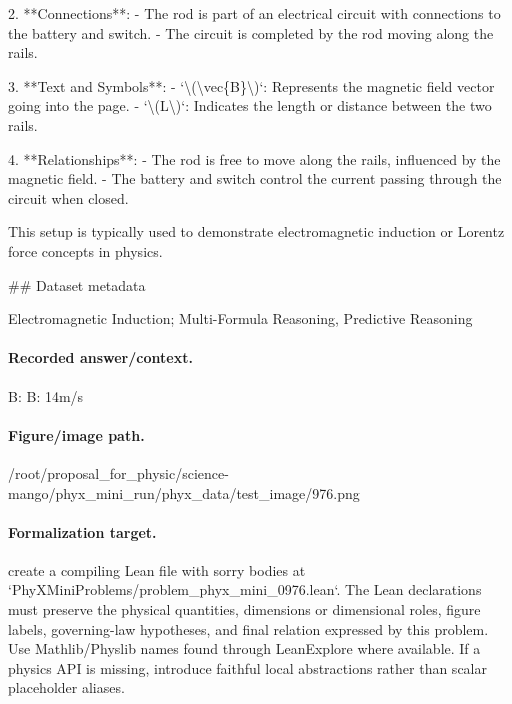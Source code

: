 2. **Connections**:
   - The rod is part of an electrical circuit with connections to the battery and switch.
   - The circuit is completed by the rod moving along the rails.

3. **Text and Symbols**:
   - `\textbackslash{}(\textbackslash{}vec\{B\}\textbackslash{})`: Represents the magnetic field vector going into the page.
   - `\textbackslash{}(L\textbackslash{})`: Indicates the length or distance between the two rails.

4. **Relationships**:
   - The rod is free to move along the rails, influenced by the magnetic field.
   - The battery and switch control the current passing through the circuit when closed.

This setup is typically used to demonstrate electromagnetic induction or Lorentz force concepts in physics.

\#\# Dataset metadata

Electromagnetic Induction; Multi-Formula Reasoning, Predictive Reasoning

\paragraph{Recorded answer/context.}
B: B: 14m/s

\paragraph{Figure/image path.}
/root/proposal\_for\_physic/science-mango/phyx\_mini\_run/phyx\_data/test\_image/976.png

\paragraph{Formalization target.}
create a compiling Lean file with sorry bodies at `PhyXMiniProblems/problem\_phyx\_mini\_0976.lean`. The Lean declarations must preserve the physical quantities, dimensions or dimensional roles, figure labels, governing-law hypotheses, and final relation expressed by this problem.
Use Mathlib/Physlib names found through LeanExplore where available. If a physics API is missing, introduce faithful local abstractions rather than scalar placeholder aliases.

